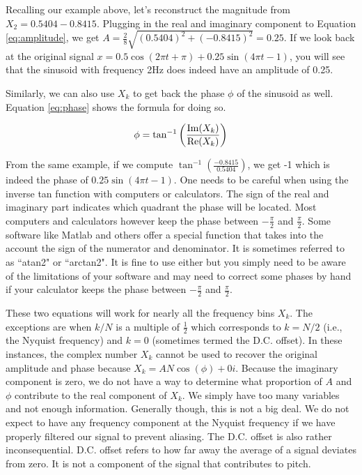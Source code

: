 Recalling our example above, let's reconstruct the magnitude from $X_2 = 0.5404 - 0.8415$.  Plugging in 
the real and imaginary component to Equation \ref{eq:amplitude}, we get 
$A = \frac{2}{8}\sqrt{(0.5404)^2 + (-0.8415)^2} = 0.25$.  If we look back at the original signal $x =
0.5\cos(2\pi t + \pi) + 0.25\sin(4\pi t - 1)$, you will see that the sinusoid with frequency 2Hz does indeed
have an amplitude of 0.25.  

Similarly, we can also use $X_k$ to get back the phase $\phi$ of the sinusoid as well.  Equation \ref{eq:phase}
shows the formula for doing so.

\begin{equation}
\label{eq:phase}
\phi = \tan^{-1}\bigg(\frac{\mathrm{Im}{(X_k)}}{\mathrm{Re}{(X_k)}}\bigg)
\end{equation}

From the same example, if we compute $\tan^{-1}(\frac{-0.8415}{0.5404})$, we get -1 which is indeed the
phase of $0.25\sin(4\pi t - 1)$.  One needs to be careful when using the inverse tan function with computers
or calculators.  The sign of the real and imaginary part indicates which quadrant the phase will be located.  Most
computers and calculators however keep the phase between $-\frac{\pi}{2}$ and $\frac{\pi}{2}$.  Some software
like Matlab and others offer a special function that takes into the account the sign of the numerator and denominator.  It is sometimes referred to as ``atan2" or ``arctan2".  It is fine to use either but you simply need
to be aware of the limitations of your software and may need to correct some phases by hand if your calculator
keeps the phase between $-\frac{\pi}{2}$ and $\frac{\pi}{2}$.

These two equations will work for nearly all the frequency bins $X_k$. The exceptions are when $k/N$
is a multiple of $\frac{1}{2}$ which corresponds to $k = N/2$ (i.e., the Nyquist frequency) and $k = 0$ 
(sometimes termed the D.C. offset).  In these 
instances, the complex number $X_k$ cannot be used to recover the original amplitude and phase because
$X_k = AN\cos{(\phi)} + 0i$.  Because the imaginary component is zero, we do not have a way to determine
what proportion of $A$ and $\phi$ contribute to the real component of $X_k$.  We simply have too many 
variables and not enough information.  Generally though, this is not a big deal.  We do not expect to have
any frequency component at the Nyquist frequency if we have properly filtered our signal to prevent aliasing.
The D.C. offset is also rather inconsequential.  D.C. offset refers to how far away the average of a signal
deviates from zero.  It is not a component of the signal that contributes to pitch.  

